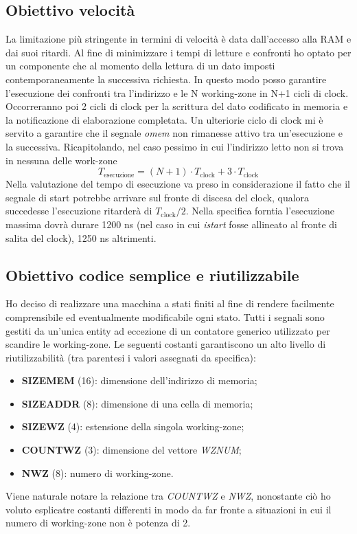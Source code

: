 \documentclass{article}
\begin{document}
\subsection{Obiettivo velocità}
La limitazione più stringente in termini di velocità è data dall'accesso alla RAM e dai suoi ritardi. Al fine di minimizzare i tempi di letture e confronti ho optato per un componente che al momento della lettura di un dato imposti contemporaneamente la successiva richiesta. In questo modo posso garantire l'esecuzione dei confronti tra l'indirizzo e le N working-zone in N+1 cicli di clock. Occorreranno poi 2 cicli di clock per la scrittura del dato codificato in memoria e la notificazione di elaborazione completata. Un ulteriorie ciclo di clock mi è servito a garantire che il segnale \textit{o\textunderscore mem} non rimanesse attivo tra un'esecuzione e la successiva.
Ricapitolando, nel caso pessimo in cui l'indirizzo letto non si trova in nessuna delle work-zone
\begin{equation*}
T_\mathrm{esecuzione} = (N+1) \cdot T_\mathrm{clock}+3 \cdot T_\mathrm{clock}
\end{equation*}
Nella valutazione del tempo di esecuzione va preso in considerazione il fatto che il segnale di start potrebbe arrivare sul fronte di discesa del clock, qualora succedesse l'esecuzione ritarderà di $T_\mathrm{clock}/2$.
Nella specifica forntia l'esecuzione massima dovrà durare 1200 ns (nel caso in cui \textit{i\textunderscore start} fosse allineato al fronte di salita del clock), 1250 ns altrimenti.
\subsection{Obiettivo codice semplice e riutilizzabile}
Ho deciso di realizzare una macchina a stati finiti al fine di rendere facilmente comprensibile ed eventualmente modificabile ogni stato.
Tutti i segnali sono gestiti da un'unica entity ad eccezione di un contatore generico utilizzato per scandire le working-zone.
Le seguenti costanti garantiscono un alto livello di riutilizzabilità (tra parentesi i valori assegnati da specifica):
\begin{itemize}
	\item \textbf{SIZE\textunderscore MEM} (16): dimensione dell'indirizzo di memoria;
	\item \textbf{SIZE\textunderscore ADDR} (8): dimensione di una cella di memoria;
	\item \textbf{SIZE\textunderscore WZ} (4): estensione della singola working-zone;
	\item \textbf{COUNT\textunderscore WZ} (3): dimensione del vettore \textit{WZ\textunderscore NUM};
	\item \textbf{N\textunderscore WZ} (8): numero di working-zone.
\end{itemize}
Viene naturale notare la relazione tra \textit{COUNT\textunderscore WZ} e \textit{N\textunderscore WZ}, nonostante ciò ho voluto esplicatre costanti differenti in modo da far fronte a situazioni in cui il numero di working-zone non è potenza di 2.
\end{document}
